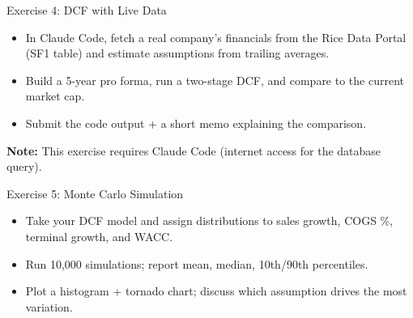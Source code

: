 \documentclass[aspectratio=169]{beamer}
\begin{document}
\begin{frame}{Exercise 4: DCF with Live Data}
\begin{itemize}
  \item In Claude Code, fetch a real company's financials from the Rice Data Portal (SF1 table) and estimate assumptions from trailing averages.
  \item Build a 5-year pro forma, run a two-stage DCF, and compare to the current market cap.
  \item Submit the code output + a short memo explaining the comparison.
\end{itemize}

\vspace{0.3cm}
\textbf{Note:} This exercise requires Claude Code (internet access for the database query).
\end{frame}

\begin{frame}{Exercise 5: Monte Carlo Simulation}
\begin{itemize}
  \item Take your DCF model and assign distributions to sales growth, COGS \%, terminal growth, and WACC.
  \item Run 10{,}000 simulations; report mean, median, 10th/90th percentiles.
  \item Plot a histogram + tornado chart; discuss which assumption drives the most variation.
\end{itemize}
\end{frame}
\end{document}
